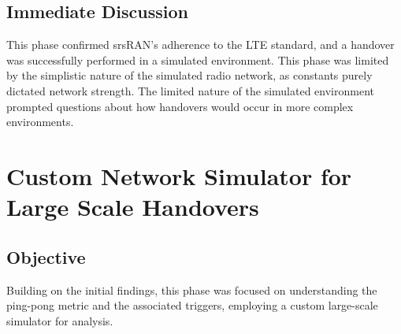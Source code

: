 \subsection{Immediate Discussion}
This phase confirmed srsRAN's adherence to the LTE standard, and a handover was successfully performed in a simulated environment. This phase was limited by the simplistic nature of the simulated radio network, as constants purely dictated network strength. The limited nature of the simulated environment prompted questions about how handovers would occur in more complex environments.

\section{Custom Network Simulator for Large Scale Handovers}
\subsection{Objective}
Building on the initial findings, this phase was focused on understanding the ping-pong metric and the associated triggers, employing a custom large-scale simulator for analysis.

